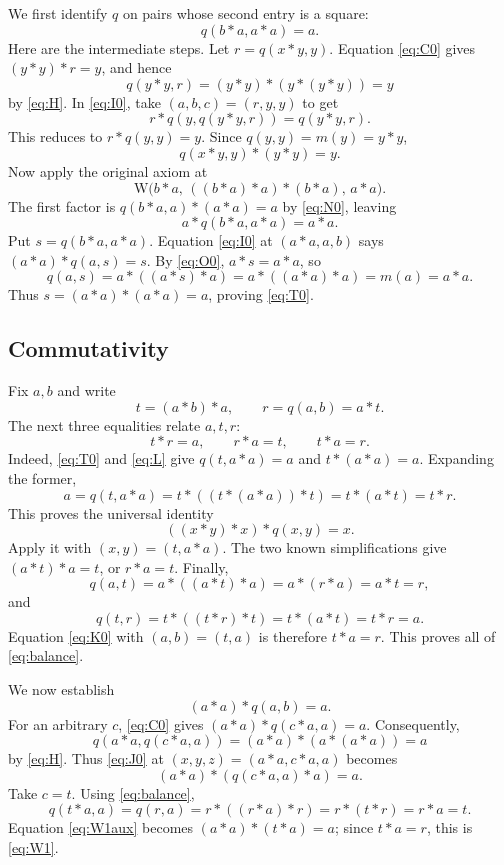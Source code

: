 \documentclass[11pt,a4paper]{article}
\newcommand{\W}{\mathrm{W}}
\begin{document}
We first identify $q$ on pairs whose second entry is a square:
\begin{equation}
 \boxed{q(b*a,a*a)=a.}\tag{$T_0$}\label{eq:T0}
\end{equation}
Here are the intermediate steps. Let $r=q(x*y,y)$. Equation \eqref{eq:C0}
gives $(y*y)*r=y$, and hence
\[
 q(y*y,r)=(y*y)*(y*(y*y))=y
\]
by \eqref{eq:H}. In \eqref{eq:I0}, take $(a,b,c)=(r,y,y)$ to get
\[
 r*q(y,q(y*y,r))=q(y*y,r).
\]
This reduces to $r*q(y,y)=y$. Since $q(y,y)=m(y)=y*y$,
\begin{equation}
 q(x*y,y)*(y*y)=y.\tag{$N_0$}\label{eq:N0}
\end{equation}
Now apply the original axiom at
\[
 \W\bigl(b*a,\,((b*a)*a)*(b*a),\,a*a\bigr).
\]
The first factor is $q(b*a,a)*(a*a)=a$ by \eqref{eq:N0}, leaving
\begin{equation}
 a*q(b*a,a*a)=a*a.\tag{$O_0$}\label{eq:O0}
\end{equation}
Put $s=q(b*a,a*a)$. Equation \eqref{eq:I0} at $(a*a,a,b)$ says
$(a*a)*q(a,s)=s$. By \eqref{eq:O0}, $a*s=a*a$, so
\[
 q(a,s)=a*((a*s)*a)=a*((a*a)*a)=m(a)=a*a.
\]
Thus $s=(a*a)*(a*a)=a$, proving \eqref{eq:T0}.

\subsection{Commutativity}
Fix $a,b$ and write
\[
 t=(a*b)*a,\qquad r=q(a,b)=a*t.
\]
The next three equalities relate $a,t,r$:
\begin{equation}
 t*r=a,\qquad r*a=t,\qquad t*a=r.\label{eq:balance}
\end{equation}
Indeed, \eqref{eq:T0} and \eqref{eq:L} give
$q(t,a*a)=a$ and $t*(a*a)=a$. Expanding the former,
\[
 a=q(t,a*a)=t*((t*(a*a))*t)=t*(a*t)=t*r.
\]
This proves the universal identity
\[
 ((x*y)*x)*q(x,y)=x.
\]
Apply it with $(x,y)=(t,a*a)$. The two known simplifications give
$(a*t)*a=t$, or $r*a=t$.
Finally,
\[
 q(a,t)=a*((a*t)*a)=a*(r*a)=a*t=r,
\]
and
\[
 q(t,r)=t*((t*r)*t)=t*(a*t)=t*r=a.
\]
Equation \eqref{eq:K0} with $(a,b)=(t,a)$ is therefore $t*a=r$.
This proves all of \eqref{eq:balance}.

We now establish
\begin{equation}
 (a*a)*q(a,b)=a.\tag{$W_1$}\label{eq:W1}
\end{equation}
For an arbitrary $c$, \eqref{eq:C0} gives $(a*a)*q(c*a,a)=a$.
Consequently,
\[
 q(a*a,q(c*a,a))=(a*a)*(a*(a*a))=a
\]
by \eqref{eq:H}. Thus \eqref{eq:J0} at $(x,y,z)=(a*a,c*a,a)$ becomes
\begin{equation}
 (a*a)*(q(c*a,a)*a)=a.\label{eq:W1aux}
\end{equation}
Take $c=t$. Using \eqref{eq:balance},
\[
 q(t*a,a)=q(r,a)=r*((r*a)*r)=r*(t*r)=r*a=t.
\]
Equation \eqref{eq:W1aux} becomes $(a*a)*(t*a)=a$; since $t*a=r$,
this is \eqref{eq:W1}.
\end{document}

